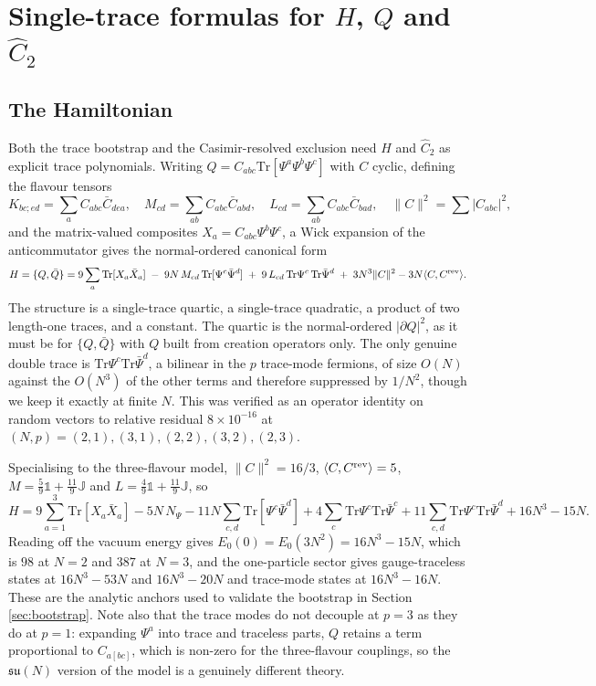\documentclass[10pt]{article}
\newcommand{\Tr}{\mathrm{Tr}}
\newcommand{\su}{\mathfrak{su}}
\newcommand{\bPsi}{\bar\Psi}
\newcommand{\bQ}{\bar Q}
\begin{document}
\section{Single-trace formulas for $H$, $Q$ and $\hat C_2$}\label{sec:singletrace}

\subsection{The Hamiltonian}

Both the trace bootstrap and the Casimir-resolved exclusion need $H$ and $\hat C_2$ as explicit trace
polynomials. Writing $Q=C_{abc}\Tr[\Psi^a\Psi^b\Psi^c]$ with $C$ cyclic, defining the flavour tensors
\begin{equation}
K_{bc;ed}=\sum_aC_{abc}\bar C_{dea},\quad M_{cd}=\sum_{ab}C_{abc}\bar C_{abd},\quad
L_{cd}=\sum_{ab}C_{abc}\bar C_{bad},\quad \|C\|^2=\sum|C_{abc}|^2,
\end{equation}
and the matrix-valued composites $X_a=C_{abc}\Psi^b\Psi^c$, a Wick expansion of the anticommutator gives the
normal-ordered canonical form
\begin{equation}
H=\{Q,\bQ\}=9\sum_a\Tr[X_a\bar X_a]\;-\;9N\,M_{cd}\,\Tr[\Psi^c\bPsi^d]\;+\;9\,L_{cd}\,\Tr\Psi^c\,\Tr\bPsi^d
\;+\;3N^3\|C\|^2-3N\langle C,C^{\rm rev}\rangle .
\label{eq:Hgeneral}
\end{equation}
The structure is a single-trace quartic, a single-trace quadratic, a product of two length-one traces, and a
constant. The quartic is the normal-ordered $|\partial Q|^2$, as it must be for $\{Q,\bQ\}$ with $Q$ built from
creation operators only. The only genuine double trace is $\Tr\Psi^c\Tr\bPsi^d$, a bilinear in the $p$
trace-mode fermions, of size $O(N)$ against the $O(N^3)$ of the other terms and therefore suppressed by
$1/N^2$, though we keep it exactly at finite $N$. This was verified as an operator identity on random vectors to
relative residual $8\times10^{-16}$ at $(N,p)=(2,1),(3,1),(2,2),(3,2),(2,3)$.

Specialising to the three-flavour model, $\|C\|^2=16/3$, $\langle C,C^{\rm rev}\rangle=5$,
$M=\frac59\mathbb 1+\frac{11}9\mathbb J$ and $L=\frac49\mathbb 1+\frac{11}9\mathbb J$, so
\begin{equation}
H=9\sum_{a=1}^3\Tr[X_a\bar X_a]-5N\,N_\Psi-11N\sum_{c,d}\Tr[\Psi^c\bPsi^d]
+4\sum_c\Tr\Psi^c\Tr\bPsi^c+11\sum_{c,d}\Tr\Psi^c\Tr\bPsi^d+16N^3-15N .
\label{eq:H3}
\end{equation}
Reading off the vacuum energy gives $E_0(0)=E_0(3N^2)=16N^3-15N$, which is $98$ at $N=2$ and $387$ at $N=3$, and
the one-particle sector gives gauge-traceless states at $16N^3-53N$ and $16N^3-20N$ and trace-mode states at
$16N^3-16N$. These are the analytic anchors used to validate the bootstrap in Section \ref{sec:bootstrap}. Note
also that the trace modes do not decouple at $p=3$ as they do at $p=1$: expanding $\Psi^a$ into trace and
traceless parts, $Q$ retains a term proportional to $C_{a[bc]}$, which is non-zero for the three-flavour
couplings, so the $\su(N)$ version of the model is a genuinely different theory.
\end{document}
